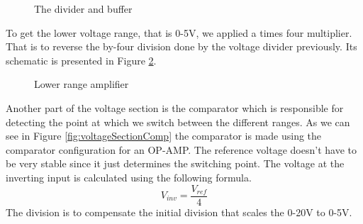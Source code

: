 \begin{figure}[h]
    \centering
    \caption{The divider and buffer}
    \label{fig:voltageSectionInput}
\end{figure}

To get the lower voltage range, that is 0-5V, we applied a times four multiplier. That is to reverse the by-four division done by the voltage divider previously. Its schematic is presented in Figure \ref{fig:voltageSectionAmp}.

\begin{figure}[h]
    \centering
    \caption{Lower range amplifier}
    \label{fig:voltageSectionAmp}
\end{figure}

Another part of the voltage section is the comparator which is responsible for detecting the point at which we switch between the different ranges. As we can see in Figure \ref{fig:voltageSectionComp} the comparator is made using the comparator configuration for an OP-AMP. The reference voltage doesn't have to be very stable since it just determines the switching point. The voltage at the inverting input is calculated using the following formula. $$V_{inv}=\frac{V_{ref}}{4}$$ The division is to compensate the initial division that scales the 0-20V to 0-5V.

